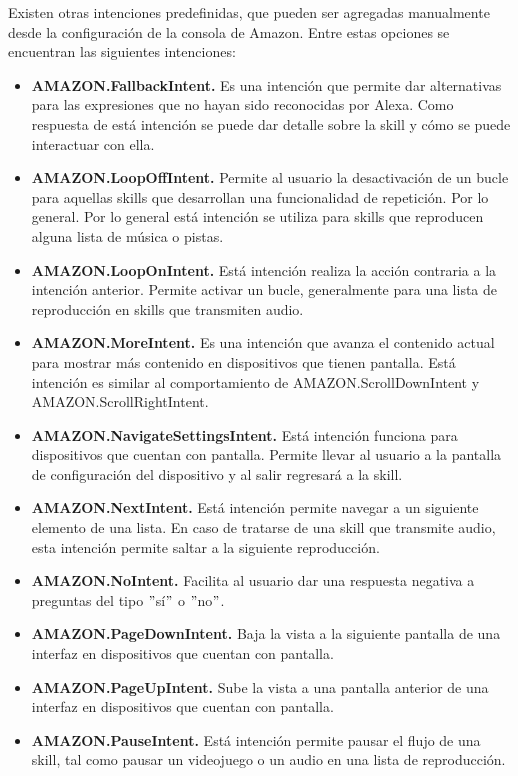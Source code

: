 Existen otras intenciones predefinidas, que pueden ser agregadas manualmente desde la configuración de la consola de Amazon. Entre estas opciones se encuentran las siguientes intenciones:

\begin{itemize}
  \item \textbf{AMAZON.FallbackIntent.} Es una intención que permite dar alternativas para las expresiones que no hayan sido reconocidas por Alexa. Como respuesta de está intención se puede dar detalle sobre la skill y cómo se puede interactuar con ella.
  \item \textbf{AMAZON.LoopOffIntent.} Permite al usuario la desactivación de un bucle para aquellas skills que desarrollan una funcionalidad de repetición. Por lo general. Por lo general está intención se utiliza para skills que reproducen alguna lista de música o pistas.
  \item \textbf{AMAZON.LoopOnIntent.} Está intención realiza la acción contraria a la intención anterior. Permite activar un bucle, generalmente para una lista de reproducción en skills que transmiten audio.
  \item \textbf{AMAZON.MoreIntent.} Es una intención que avanza el contenido actual para mostrar más contenido en dispositivos que tienen pantalla. Está intención es similar al comportamiento de AMAZON.ScrollDownIntent y AMAZON.ScrollRightIntent.
  \item \textbf{AMAZON.NavigateSettingsIntent.} Está intención funciona para dispositivos que cuentan con pantalla. Permite llevar al usuario a la pantalla de configuración del dispositivo y al salir regresará a la skill.
  \item \textbf{AMAZON.NextIntent.} Está intención permite navegar a un siguiente elemento de una lista. En caso de tratarse de una skill que transmite audio, esta intención permite saltar a la siguiente reproducción.
  \item \textbf{AMAZON.NoIntent.} Facilita al usuario dar una respuesta negativa a preguntas del tipo $"$sí$"$ o $"$no$"$.
  \item \textbf{AMAZON.PageDownIntent.} Baja la vista a la siguiente pantalla de una interfaz en dispositivos que cuentan con pantalla.
  \item \textbf{AMAZON.PageUpIntent.} Sube la vista a una pantalla anterior de una interfaz en dispositivos que cuentan con pantalla.
  \item \textbf{AMAZON.PauseIntent.} Está intención permite pausar el flujo de una skill, tal como pausar un videojuego o un audio en una lista de reproducción.

\end{itemize}
